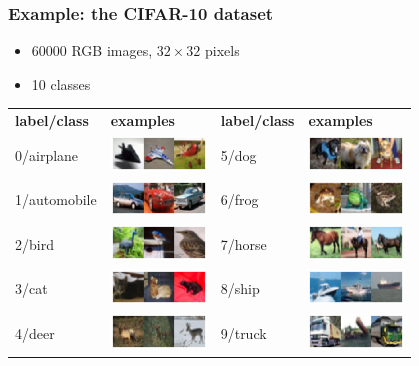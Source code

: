\documentclass{beamer}
\begin{document}
    \begin{frame}
        \frametitle{Example: the CIFAR-10 dataset}

        \begin{itemize}
            \item $60000$ RGB images, $32\times 32$ pixels
            \item 10 classes
        \end{itemize}
    
        \bigskip
        \begin{tabular}{ m{0.8in} m{1in} | m{0.75in} m{1in} }
            \textbf{label/class} & \textbf{examples}& \textbf{label/class}&\textbf{examples}\\[0.5em]
            0/airplane & \includegraphics[width=1in]{../cifar10/airplane.jpg}&5/dog&\includegraphics[width=1in]{../cifar10/dog.jpg}\\
            1/automobile & \includegraphics[width=1in]{../cifar10/automobile.jpg}&6/frog&\includegraphics[width=1in]{../cifar10/frog.jpg}\\
            2/bird & \includegraphics[width=1in]{../cifar10/bird.jpg}&7/horse&\includegraphics[width=1in]{../cifar10/horse.jpg}\\
            3/cat & \includegraphics[width=1in]{../cifar10/cat.jpg}&8/ship&\includegraphics[width=1in]{../cifar10/ship.jpg}\\
            4/deer & \includegraphics[width=1in]{../cifar10/deer.jpg}&9/truck&\includegraphics[width=1in]{../cifar10/truck.jpg}\\
        \end{tabular}
    \end{frame}
\end{document}
